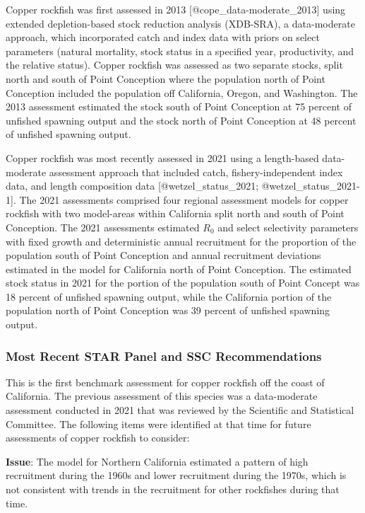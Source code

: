 \documentclass[11pt,
  letterpaper,
]{article}
\begin{document}
Copper rockfish was first assessed in 2013 {[}@cope\_data-moderate\_2013{]} using extended depletion-based stock reduction analysis (XDB-SRA), a data-moderate approach, which incorporated catch and index data with priors on select parameters (natural mortality, stock status in a specified year, productivity, and the relative status). Copper rockfish was assessed as two separate stocks, split north and south of Point Conception where the population north of Point Conception included the population off California, Oregon, and Washington. The 2013 assessment estimated the stock south of Point Conception at 75 percent of unfished spawning output and the stock north of Point Conception at 48 percent of unfished spawning output.

Copper rockfish was most recently assessed in 2021 using a length-based data-moderate assessment approach that included catch, fishery-independent index data, and length composition data {[}@wetzel\_status\_2021; @wetzel\_status\_2021-1{]}. The 2021 assessments comprised four regional assessment models for copper rockfish with two model-areas within California split north and south of Point Conception. The 2021 assessments estimated \(R_0\) and select selectivity parameters with fixed growth and deterministic annual recruitment for the proportion of the population south of Point Conception and annual recruitment deviations estimated in the model for California north of Point Conception. The estimated stock status in 2021 for the portion of the population south of Point Concept was 18 percent of unfished spawning output, while the California portion of the population north of Point Conception was 39 percent of unfished spawning output.

\subsubsection{Most Recent STAR Panel and SSC Recommendations}\label{most-recent-star-panel-and-ssc-recommendations}

This is the first benchmark assessment for copper rockfish off the coast of California. The previous assessment of this species was a data-moderate assessment conducted in 2021 that was reviewed by the Scientific and Statistical Committee. The following items were identified at that time for future assessments of copper rockfish to consider:

\textbf{Issue}: The model for Northern California estimated a pattern of high recruitment during the 1960s and lower recruitment during the 1970s, which is not consistent with trends in the recruitment for other rockfishes during that time.
\end{document}
